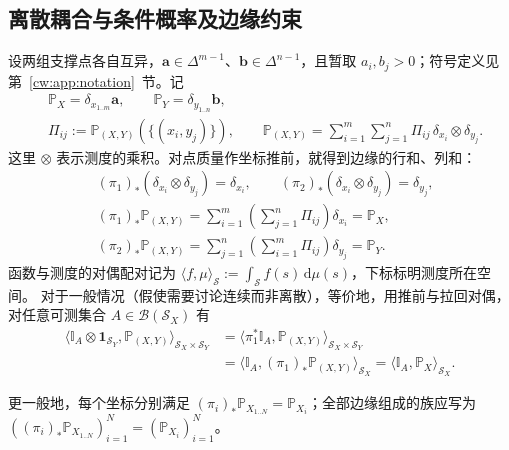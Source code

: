 \subsection{离散耦合与条件概率及边缘约束}\label{cw:sec:discrete-ot}

设两组支撑点各自互异，$\bm a\in\Delta^{m-1}$、$\bm b\in\Delta^{n-1}$，且暂取 $a_i,b_j>0$；符号定义见第~\ref{cw:app:notation}~节。记
\begin{equation}\label{cw:eq:discrete-coupling}
\begin{aligned}
&\mathbb P_X=\delta_{x_{1..m}}\bm a,\qquad
\mathbb P_Y=\delta_{y_{1..n}}\bm b,\\
&\Pi_{ij}:=\mathbb P_{(X,Y)}(\{(x_i,y_j)\}),\qquad
\mathbb P_{(X,Y)}=\sum_{i=1}^m\sum_{j=1}^n\Pi_{ij}\,
\delta_{x_i}\otimes\delta_{y_j}.
\end{aligned}
\end{equation}
这里 $\otimes$ 表示测度的乘积。对点质量作坐标推前，就得到边缘的行和、列和：
\begin{equation}\label{cw:eq:discrete-marginals}
\begin{aligned}
&(\pi_1)_*(\delta_{x_i}\otimes\delta_{y_j})=\delta_{x_i},\qquad
(\pi_2)_*(\delta_{x_i}\otimes\delta_{y_j})=\delta_{y_j},\\
&(\pi_1)_*\mathbb P_{(X,Y)}=\sum_{i=1}^m\left(\sum_{j=1}^n\Pi_{ij}\right)\delta_{x_i}=\mathbb P_X,\\
&(\pi_2)_*\mathbb P_{(X,Y)}=\sum_{j=1}^n\left(\sum_{i=1}^m\Pi_{ij}\right)\delta_{y_j}=\mathbb P_Y.
\end{aligned}
\end{equation}
函数与测度的对偶配对记为 $\langle f,\mu\rangle_{\mathcal S}:=\int_{\mathcal S}f(s)\,\mathrm d\mu(s)$，下标标明测度所在空间。
对于一般情况（假使需要讨论连续而非离散），等价地，用推前与拉回对偶，对任意可测集合 $A\in\mathcal B(\mathcal S_X)$ 有
\begin{equation}\label{cw:eq:marginal-duality}
\begin{aligned}
\langle\mathbb I_A\otimes\mathbf1_{\mathcal S_Y},\mathbb P_{(X,Y)}\rangle_{\mathcal S_X\times\mathcal S_Y}
&=\langle\pi_1^*\mathbb I_A,\mathbb P_{(X,Y)}\rangle_{\mathcal S_X\times\mathcal S_Y}\\
&=\langle\mathbb I_A,(\pi_1)_*\mathbb P_{(X,Y)}\rangle_{\mathcal S_X}
=\langle\mathbb I_A,\mathbb P_X\rangle_{\mathcal S_X}.
\end{aligned}
\end{equation}
\begingroup\raggedright
更一般地，每个坐标分别满足 $(\pi_i)_*\mathbb P_{X_{1..N}}=\mathbb P_{X_i}$；全部边缘组成的族应写为
$((\pi_i)_*\mathbb P_{X_{1..N}})_{i=1}^N=(\mathbb P_{X_i})_{i=1}^N$。\par
\endgroup

